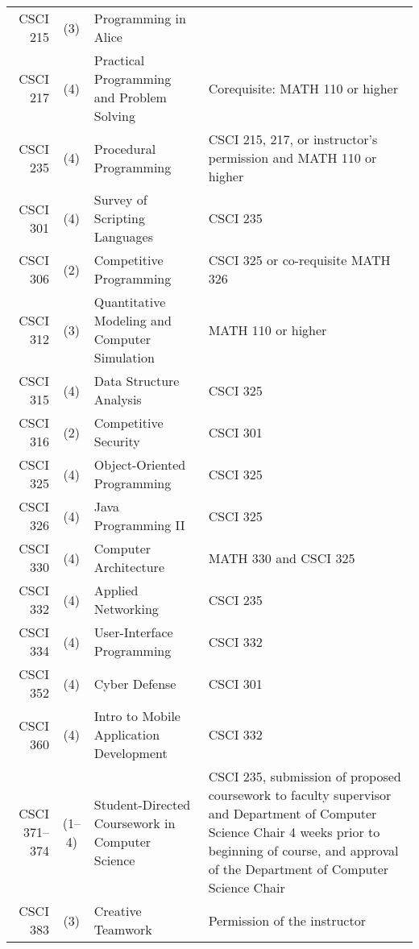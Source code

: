 \begin{reqgroup}[left*=1pt,right*=1pt,bottom=0pt]{}
\begin{tabularx}{\textwidth}{ r c l  | X }
	CSCI 215 & (3) & Programming in Alice &\\
	CSCI 217 & (4) & Practical Programming and Problem Solving & Corequisite: MATH 110 or higher\\
	CSCI 235 & (4) & Procedural Programming                              & CSCI 215, 217, or instructor's permission and MATH 110 or higher \\
	CSCI 301 & (4) & Survey of Scripting Languages                       & CSCI 235 \\
	CSCI 306 & (2) & Competitive Programming                             & CSCI 325 or co-requisite MATH 326 \\
	CSCI 312 & (3) & Quantitative Modeling and Computer Simulation       & MATH 110 or higher \\
	CSCI 315 & (4) & Data Structure Analysis                             & CSCI 325 \\
	CSCI 316 & (2) & Competitive Security                                & CSCI 301 \\
	CSCI 325 & (4) & Object-Oriented Programming                         & CSCI 325 \\
	CSCI 326 & (4) & Java Programming II                                 &  CSCI 325 \\
	CSCI 330 & (4) & Computer Architecture                               & MATH 330 and CSCI 325 \\
	CSCI 332 & (4) & Applied Networking                                  & CSCI 235 \\
	CSCI 334 & (4) & User-Interface Programming                          & CSCI 332 \\
	CSCI 352 & (4) & Cyber Defense                                       & CSCI 301 \\
	CSCI 360 & (4) & Intro to Mobile Application Development                         & CSCI 332 \\
	CSCI 371--374 & (1--4) & Student-Directed Coursework in Computer Science & CSCI 235, submission of proposed coursework to faculty supervisor and Department of Computer Science Chair 4 weeks prior to beginning of course, and approval of the Department of Computer Science Chair \\
	CSCI 383 & (3) & Creative Teamwork                                   & Permission of the instructor \\

\end{tabularx}
\end{reqgroup}
